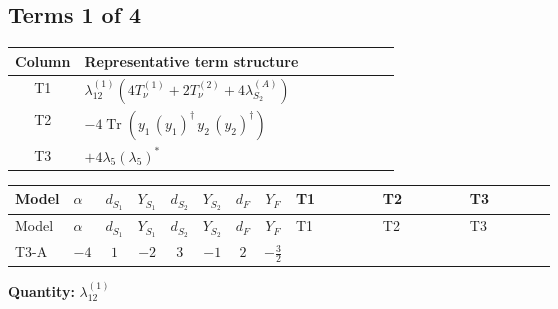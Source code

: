 \documentclass[8pt]{article}
\begin{document}
\begin{landscape}
\subsection*{Terms 1 of 4}
\begin{center}
\begin{tabular}{@{}c >{\raggedright\arraybackslash}p{0.82\linewidth}@{}}
\toprule
Column & Representative term structure \\
\midrule
T1 & \(\displaystyle {\lambda_{12}^{(1)}} (4 T_{\nu}^{(1)}+2 T_{\nu}^{(2)}+4 {\lambda_{S_2}^{(A)}})\) \\
\midrule
T2 & \(\displaystyle -4 \operatorname{Tr}\!\left({y_1}\,\left({y_1}\right)^{\dagger}\,{y_2}\,\left({y_2}\right)^{\dagger}\right)\) \\
\midrule
T3 & \(\displaystyle +4 {\lambda_5} \left({\lambda_5}\right)^{*}\) \\
\midrule
\bottomrule
\end{tabular}
\end{center}
\smallskip
\tiny
\begin{longtable}{@{}llcccccc >{\raggedright\arraybackslash}p{0.21\linewidth} >{\raggedright\arraybackslash}p{0.21\linewidth} >{\raggedright\arraybackslash}p{0.21\linewidth}@{}}
\toprule
Model & $\alpha$ & $d_{S_1}$ & $Y_{S_1}$ & $d_{S_2}$ & $Y_{S_2}$ & $d_F$ & $Y_F$ & T1 & T2 & T3 \\
\midrule
\endfirsthead
\toprule
Model & $\alpha$ & $d_{S_1}$ & $Y_{S_1}$ & $d_{S_2}$ & $Y_{S_2}$ & $d_F$ & $Y_F$ & T1 & T2 & T3 \\
\midrule
\endhead
T3-A & $-4$ & $1$ & $-2$ & $3$ & $-1$ & $2$ & $-\frac{3}{2}$ & \scriptsize\adjustbox{max width=\linewidth}{$\begin{gathered} {\lambda_{12}^{(1)}} (4 T_{\nu}^{(1)}+2 T_{\nu}^{(2)}+4 {\lambda_{S_2}^{(A)}})\end{gathered}$} & \scriptsize\adjustbox{max width=\linewidth}{$\begin{gathered} -4 \operatorname{Tr}\!\left({y_1}\,\left({y_1}\right)^{\dagger}\,{y_2}\,\left({y_2}\right)^{\dagger}\right)\end{gathered}$} & \scriptsize\adjustbox{max width=\linewidth}{$\begin{gathered} +4 {\lambda_5} \left({\lambda_5}\right)^{*}\end{gathered}$} \\
\midrule
\bottomrule
\end{longtable}
\clearpage
\noindent\textbf{Quantity: }$\lambda_{12}^{(1)}$\par\smallskip

\end{landscape}
\end{document}
